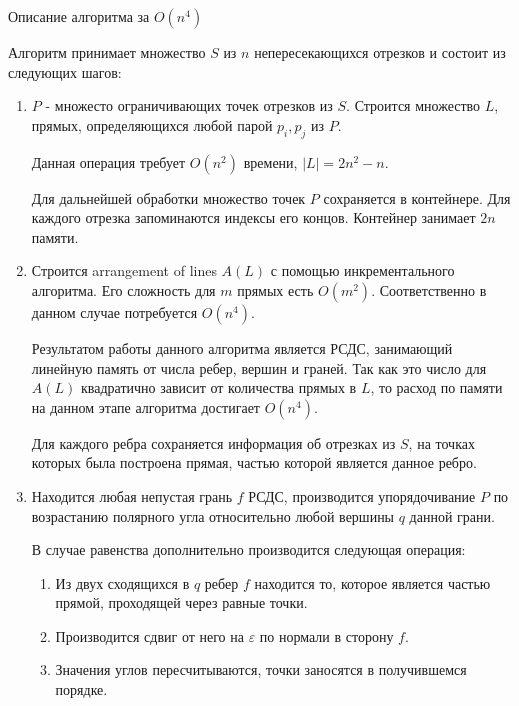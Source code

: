 \documentclass[letterpaper,12pt]{article}
\begin{document}
\begin{center}
Описание алгоритма за $O(n^4)$
\end{center}
\par
Алгоритм принимает множество $S$ из $n$ непересекающихся отрезков и 
состоит из следующих шагов:
\begin{enumerate}
      \item $P$ - множесто ограничивающих точек отрезков из $S$.
            Строится множество $L$, прямых, определяющихся любой парой $p_i, p_j$ из $P$.
            \par
            Данная операция требует $O(n^2)$ времени, $|L| = 2n^2-n$.
            \par
            Для дальнейшей обработки множество точек $P$ сохраняется в контейнере.
            Для каждого отрезка запоминаются индексы его концов.
            Контейнер занимает $2n$ памяти.
      \item Строится arrangement of lines $A(L)$ с помощью 
            инкрементального алгоритма. Его сложность для $m$ прямых
            есть $O(m^2)$. Соответственно в данном случае потребуется
            $O(n^4)$.
            \par
            Результатом работы данного алгоритма является РСДС,
            занимающий линейную память от числа ребер, вершин и граней.
            Так как это число для $A(L)$ квадратично зависит от количества
            прямых в $L$, то расход по памяти на данном этапе алгоритма достигает
            $O(n^4)$.
            \par
            Для каждого ребра сохраняется информация об отрезках из $S$,
            на точках которых была построена прямая, 
            частью которой является данное ребро.
      \item Находится любая непустая грань $f$ РСДС, производится упорядочивание $P$ 
            по возрастанию полярного угла относительно любой вершины $q$ данной грани.
            \par
            В случае равенства дополнительно производится следующая операция:
            \begin{enumerate}
                  \item Из двух сходящихся в $q$ ребер $f$ находится то, 
                        которое является частью прямой, проходящей через равные точки. 
                  \item Производится сдвиг от него на $\varepsilon$ по нормали в сторону $f$.
                  \item Значения углов пересчитываются, точки заносятся в получившемся порядке.

\end{enumerate}
\end{enumerate}
\end{document}
